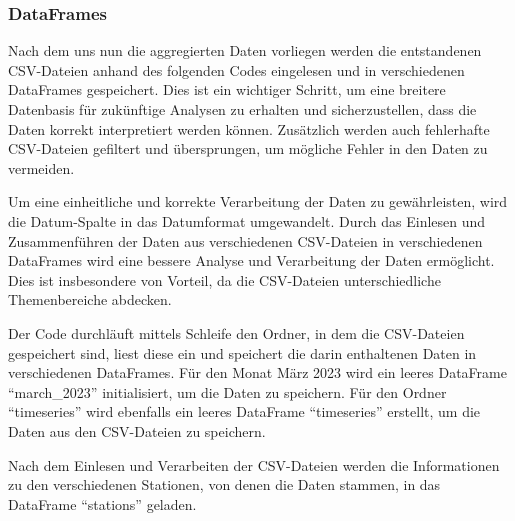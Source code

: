 \documentclass[11pt]{article}
\begin{document}
    \hypertarget{dataframes}{%
\subsubsection{DataFrames}\label{dataframes}}

    Nach dem uns nun die aggregierten Daten vorliegen werden die
entstandenen CSV-Dateien anhand des folgenden Codes eingelesen und in
verschiedenen DataFrames gespeichert. Dies ist ein wichtiger Schritt, um
eine breitere Datenbasis für zukünftige Analysen zu erhalten und
sicherzustellen, dass die Daten korrekt interpretiert werden können.
Zusätzlich werden auch fehlerhafte CSV-Dateien gefiltert und
übersprungen, um mögliche Fehler in den Daten zu vermeiden.

Um eine einheitliche und korrekte Verarbeitung der Daten zu
gewährleisten, wird die Datum-Spalte in das Datumformat umgewandelt.
Durch das Einlesen und Zusammenführen der Daten aus verschiedenen
CSV-Dateien in verschiedenen DataFrames wird eine bessere Analyse und
Verarbeitung der Daten ermöglicht. Dies ist insbesondere von Vorteil, da
die CSV-Dateien unterschiedliche Themenbereiche abdecken.

Der Code durchläuft mittels Schleife den Ordner, in dem die CSV-Dateien
gespeichert sind, liest diese ein und speichert die darin enthaltenen
Daten in verschiedenen DataFrames. Für den Monat März 2023 wird ein
leeres DataFrame ``march\_2023'' initialisiert, um die Daten zu
speichern. Für den Ordner ``timeseries'' wird ebenfalls ein leeres
DataFrame ``timeseries'' erstellt, um die Daten aus den CSV-Dateien zu
speichern.

Nach dem Einlesen und Verarbeiten der CSV-Dateien werden die
Informationen zu den verschiedenen Stationen, von denen die Daten
stammen, in das DataFrame ``stations'' geladen.
\end{document}
